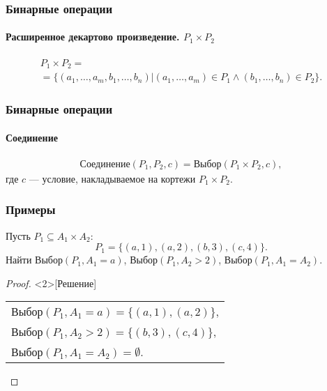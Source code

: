 \begin{frame}
    \frametitle{Бинарные операции}
    \framesubtitle{Расширенное декартово произведение. $P_1\times P_2$}
    
    \[
        \begin{split}
            P_1\times P_2=\\
            =\{(a_1,\ldots,a_m,b_1,\ldots,b_n)|(a_1,\ldots,a_m)\in P_1 \land (b_1,\ldots,b_n)\in P_2\}.
        \end{split}
    \]
\end{frame}
    
\begin{frame}
    \frametitle{Бинарные операции}
    \framesubtitle{Соединение}

    \[
        \begin{split}
            \textit{Соединение}(P_1, P_2, c)=\textit{Выбор}(P_1\times P_2, c),
        \end{split}
    \]
    где $c$ --- условие, накладываемое на кортежи $P_1\times P_2$.
\end{frame}

\begin{frame}
    \frametitle{Примеры}

    \begin{example}
        Пусть $P_1\subseteq A_1\times A_2$:
        \[
            P_1=\{(a,1),(a,2),(b,3),(c,4)\}.
        \]
        Найти $\textit{Выбор}(P_1,A_1=a)$, $\textit{Выбор}(P_1,A_2>2)$, $\textit{Выбор}(P_1,A_1=A_2)$.

    \end{example}
    
    \begin{proof}<2>[Решение]
        \begin{tabular}{l}
            $\textit{Выбор}(P_1,A_1=a)=\{(a,1),(a,2)\}$,\\
            $\textit{Выбор}(P_1,A_2>2)=\{(b,3),(c,4)\}$,\\
            $\textit{Выбор}(P_1,A_1=A_2)=\emptyset$.
        \end{tabular}
    \end{proof}
\end{frame}
    
